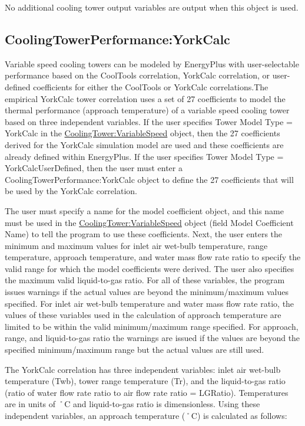 No additional cooling tower output variables are output when this object is used.

\subsection{CoolingTowerPerformance:YorkCalc}\label{coolingtowerperformanceyorkcalc}

Variable speed cooling towers can be modeled by EnergyPlus with user-selectable performance based on the CoolTools correlation, YorkCalc correlation, or user-defined coefficients for either the CoolTools or YorkCalc correlations.The empirical YorkCalc tower correlation uses a set of 27 coefficients to model the thermal performance (approach temperature) of a variable speed cooling tower based on three independent variables. If the user specifies Tower Model Type = YorkCalc in the \hyperref[coolingtowervariablespeed]{CoolingTower:VariableSpeed} object, then the 27 coefficients derived for the YorkCalc simulation model are used and these coefficients are already defined within EnergyPlus. If the user specifies Tower Model Type = YorkCalcUserDefined, then the user must enter a CoolingTowerPerformance:YorkCalc object to define the 27 coefficients that will be used by the YorkCalc correlation.

The user must specify a name for the model coefficient object, and this name must be used in the \hyperref[coolingtowervariablespeed]{CoolingTower:VariableSpeed} object (field Model Coefficient Name) to tell the program to use these coefficients. Next, the user enters the minimum and maximum values for inlet air wet-bulb temperature, range temperature, approach temperature, and water mass flow rate ratio to specify the valid range for which the model coefficients were derived. The user also specifies the maximum valid liquid-to-gas ratio. For all of these variables, the program issues warnings if the actual values are beyond the minimum/maximum values specified. For inlet air wet-bulb temperature and water mass flow rate ratio, the values of these variables used in the calculation of approach temperature are limited to be within the valid minimum/maximum range specified. For approach, range, and liquid-to-gas ratio the warnings are issued if the values are beyond the specified minimum/maximum range but the actual values are still used.

The YorkCalc correlation has three independent variables: inlet air wet-bulb temperature (Twb), tower range temperature (Tr), and the liquid-to-gas ratio (ratio of water flow rate ratio to air flow rate ratio = LGRatio). Temperatures are in units of ˚C and liquid-to-gas ratio is dimensionless. Using these independent variables, an approach temperature (˚C) is calculated as follows:

